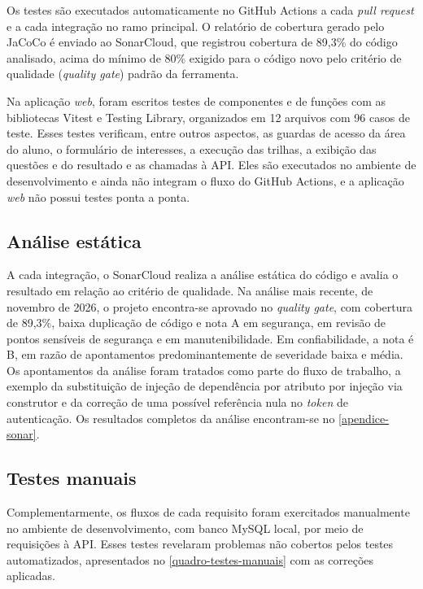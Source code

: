 Os testes são executados automaticamente no GitHub Actions a cada \textit{pull request} e a cada integração no ramo principal. O relatório de cobertura gerado pelo JaCoCo é enviado ao SonarCloud, que registrou cobertura de 89,3\% do código analisado, acima do mínimo de 80\% exigido para o código novo pelo critério de qualidade (\textit{quality gate}) padrão da ferramenta.

Na aplicação \textit{web}, foram escritos testes de componentes e de funções com as bibliotecas Vitest e Testing Library, organizados em 12 arquivos com 96 casos de teste. Esses testes verificam, entre outros aspectos, as guardas de acesso da área do aluno, o formulário de interesses, a execução das trilhas, a exibição das questões e do resultado e as chamadas à API. Eles são executados no ambiente de desenvolvimento e ainda não integram o fluxo do GitHub Actions, e a aplicação \textit{web} não possui testes ponta a ponta.

\subsection{Análise estática}

A cada integração, o SonarCloud realiza a análise estática do código e avalia o resultado em relação ao critério de qualidade. Na análise mais recente, de novembro de 2026, o projeto encontra-se aprovado no \textit{quality gate}, com cobertura de 89,3\%, baixa duplicação de código e nota A em segurança, em revisão de pontos sensíveis de segurança e em manutenibilidade. Em confiabilidade, a nota é B, em razão de apontamentos predominantemente de severidade baixa e média. Os apontamentos da análise foram tratados como parte do fluxo de trabalho, a exemplo da substituição de injeção de dependência por atributo por injeção via construtor e da correção de uma possível referência nula no \textit{token} de autenticação. Os resultados completos da análise encontram-se no \autoref{apendice-sonar}.

\subsection{Testes manuais}

Complementarmente, os fluxos de cada requisito foram exercitados manualmente no ambiente de desenvolvimento, com banco MySQL local, por meio de requisições à API. Esses testes revelaram problemas não cobertos pelos testes automatizados, apresentados no \autoref{quadro-testes-manuais} com as correções aplicadas.


